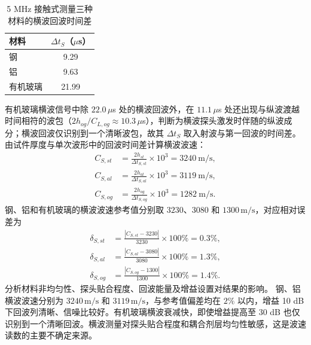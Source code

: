 \documentclass[UTF8,a4paper,12pt]{ctexart}
\numberwithin{equation}{section}
\begin{document}
\begin{table}[H]
\centering
\caption{5 MHz 接触式测量三种材料的横波回波时间差}
\label{tab:exp2-S-time}
\begin{tabular}{lc}
\toprule
材料 & $\Delta t_S$（$\mu$s）\\
\midrule
钢 & 9.29\\
铝 & 9.63\\
有机玻璃 & 21.99\\
\bottomrule
\end{tabular}
\end{table}

有机玻璃横波信号中除 $22.0\,\mu$s 处的横波回波外，在 $11.1\,\mu$s 处还出现与纵波渡越时间相符的波包（$2h_{og}/C_{L,og}\approx10.3\,\mu$s），判断为横波探头激发时伴随的纵波成分；横波回波仅识别到一个清晰波包，故其 $\Delta t_S$ 取入射波与第一回波的时间差。由试件厚度与单次波形中的回波时间差计算横波波速：
\begin{subequations}
\begin{align}
  C_{S,st}&=\frac{2h_{st}}{\Delta t_{S,st}}\times10^3
  =3240\ \mathrm{m/s},\\
  C_{S,al}&=\frac{2h_{al}}{\Delta t_{S,al}}\times10^3
  =3119\ \mathrm{m/s},\\
  C_{S,og}&=\frac{2h_{og}}{\Delta t_{S,og}}\times10^3
  =1282\ \mathrm{m/s}.
\end{align}
\end{subequations}
钢、铝和有机玻璃的横波波速参考值分别取 $3230$、$3080$ 和 $1300\,\mathrm{m/s}$，对应相对误差为
\begin{subequations}
\begin{align}
  \delta_{S,st}&=\frac{|C_{S,st}-3230|}{3230}\times100\%=0.3\%,\\
  \delta_{S,al}&=\frac{|C_{S,al}-3080|}{3080}\times100\%=1.3\%,\\
  \delta_{S,og}&=\frac{|C_{S,og}-1300|}{1300}\times100\%=1.4\%.
\end{align}
\end{subequations}
分析材料非均匀性、探头贴合程度、回波能量及增益设置对结果的影响。
钢、铝横波波速分别为 $3240\,\mathrm{m/s}$ 和 $3119\,\mathrm{m/s}$，与参考值偏差均在 $2\%$ 以内，增益 10 dB 下回波列清晰、信噪比较好。有机玻璃横波衰减快，即使增益提高至 30 dB 也仅识别到一个清晰回波。横波测量对探头贴合程度和耦合剂层均匀性敏感，这是波速读数的主要不确定来源。
\end{document}
